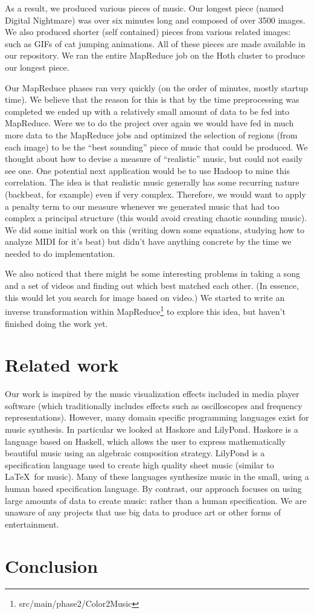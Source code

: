 \documentclass[10pt, conference, compsocconf]{IEEEtran}
\newcommand{\code}[1]{\textsf{\small #1}}
\begin{document}
As a result, we produced various pieces of music.  Our longest piece
(named \code{Digital Nightmare}) was over six minutes long and
composed of over 3500 images.  We also produced shorter (self
contained) pieces from various related images: such as GIFs of cat
jumping animations.  All of these pieces are made available in our
repository.  We ran the entire MapReduce job on the Hoth cluster to
produce our longest piece.

Our MapReduce phases ran very quickly (on the order of minutes, mostly
startup time).  We believe that the reason for this is that by the
time preprocessing was completed we ended up with a relatively small
amount of data to be fed into MapReduce.  Were we to do the project
over again we would have fed in much more data to the MapReduce jobs
and optimized the selection of regions (from each image) to be the
``best sounding'' piece of music that could be produced.  We thought
about how to devise a measure of ``realistic'' music, but could not
easily see one.  One potential next application would be to use Hadoop
to mine this correlation.  The idea is that realistic music generally
has some recurring nature (backbeat, for example) even if very
complex.  Therefore, we would want to apply a penalty term to our
measure whenever we generated music that had too complex a principal
structure (this would avoid creating chaotic sounding music).  We did
some initial work on this (writing down some equations, studying how
to analyze MIDI for it's beat) but didn't have anything concrete by
the time we needed to do implementation.

We also noticed that there might be some interesting problems in
taking a song and a set of videos and finding out which best matched
each other.  (In essence, this would let you search for image based on
video.)  We started to write an inverse transformation within
MapReduce\footnote{src/main/phase2/Color2Music} to explore this idea,
but haven't finished doing the work yet.

\section{Related work}

Our work is inspired by the music visualization effects included in
media player software (which traditionally includes effects such as
oscilloscopes and frequency representations).  However, many domain
specific programming languages exist for music synthesis.  In
particular we looked at Haskore \cite{haskore} and
LilyPond\cite{lilypond}.  Haskore is a language based on Haskell,
which allows the user to express mathematically beautiful music using
an algebraic composition strategy.  LilyPond is a specification
language used to create high quality sheet music (similar to \LaTeX\ 
for music).  Many of these languages synthesize music in the small,
using a human based specification language.  By contrast, our approach
focuses on using large amounts of data to create music: rather than a
human specification.  We are unaware of any projects that use big data
to produce art or other forms of entertainment.

\section{Conclusion}





\end{document}
